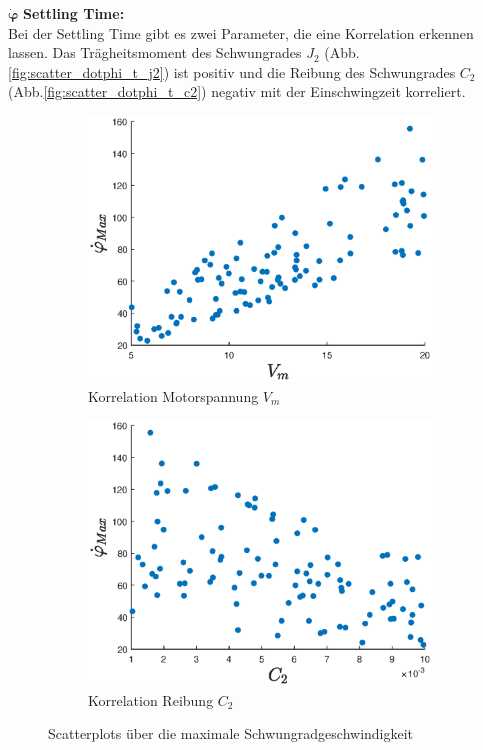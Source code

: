 $\bm{\dot\varphi}$ \textbf{Settling Time: }\\
Bei der Settling Time gibt es zwei Parameter, die  eine Korrelation erkennen lassen.
Das Trägheitsmoment des Schwungrades $J_2$ (Abb.\ref{fig:scatter_dotphi_t_j2}) ist positiv und die Reibung des Schwungrades $C_2$ (Abb.\ref{fig:scatter_dotphi_t_c2}) negativ mit der Einschwingzeit korreliert.
\begin{figure}
    \centering
    \begin{subfigure}[]{0.45\textwidth}
        \centering
        \includegraphics[width=\textwidth]{Bilder/5_sensi/cm/dot_phi_max.eps}
        \caption{Korrelation Motorspannung $V_m$}
        \label{fig:scatter_dotphi_max}
    \end{subfigure}
   \begin{subfigure}[]{0.45\textwidth}
        \centering
        \includegraphics[width=\textwidth]{Bilder/5_sensi/cm/dot_phi_max_c2.eps}
        \caption{Korrelation Reibung $C_2$}
        \label{fig:scatter_dotphi_c2}
    \end{subfigure}
    \caption{Scatterplots über die maximale Schwungradgeschwindigkeit}
\end{figure}

